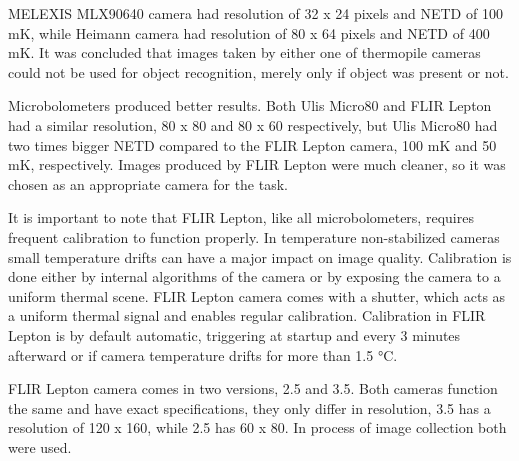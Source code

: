 MELEXIS MLX90640 camera had resolution of 32 x 24 pixels and NETD of 100 \si{\milli\kelvin}, while Heimann camera had resolution of 80 x 64 pixels and NETD of 400 \si{\milli\kelvin}.
It was concluded that images taken by either one of thermopile cameras could not be used for object recognition, merely only if object was present or not\cite{thermal_comparison}.

Microbolometers produced better results.
Both Ulis Micro80 and FLIR Lepton had a similar resolution, 80 x 80 and 80 x 60 respectively, but Ulis Micro80 had two times bigger NETD compared to the FLIR Lepton camera, 100 \si{\milli\kelvin} and 50 \si{\milli\kelvin}, respectively.
Images produced by FLIR Lepton were much cleaner, so it was chosen as an appropriate camera for the task.

It is important to note that FLIR Lepton, like all microbolometers, requires frequent calibration to function properly.
In temperature non-stabilized cameras small temperature drifts can have a major impact on image quality\cite{thermal_book}.
Calibration is done either by internal algorithms of the camera or by exposing the camera to a uniform thermal scene.
FLIR Lepton camera comes with a shutter, which acts as a uniform thermal signal and enables regular calibration.
Calibration in FLIR Lepton is by default automatic, triggering at startup and every 3 minutes afterward or if camera temperature drifts for more than 1.5 \si{\celsius}.

FLIR Lepton camera comes in two versions, 2.5 and 3.5.
Both cameras function the same and have exact specifications, they only differ in resolution, 3.5 has a resolution of 120 x 160, while 2.5 has 60 x 80.
In process of image collection both were used.
